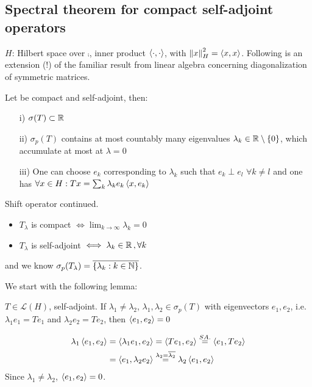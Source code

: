 \documentclass{article}
\begin{document}
\subsection{Spectral theorem for compact self-adjoint operators}
$H$: Hilbert space over $\comp$, inner product $\left<{\cdot},{\cdot}\right>$, with $\left\|{x}\right\|^2_H=\left<{x},{x}\right>$. Following is an extension (!) of the familiar result from linear algebra concerning diagonalization of symmetric matrices.
\begin{theorem}\nl
	Let   be compact and self-adjoint, then:
	\begin{itemize}
		\item [i)] $\sigma(T)\subset\mathbb{R}$
		\item [ii)] $\sigma_p(T)$ contains at most countably many eigenvalues $\lambda_k\in\mathbb{R}\setminus\{0\}$, which accumulate at most at $\lambda=0$
		\item [iii)] One can choose $e_k$  corresponding to $\lambda_k$ such that $e_k\perp e_l$ $\forall k\neq l$ and one has $\forall x\in H:Tx=\sum_k \lambda_k e_k\left<{x},{e_k}\right>$
	\end{itemize}
\end{theorem}
\begin{example}\nl
	Shift operator  continued.\\
	\begin{itemize}
	    \item $T_\lambda$ is compact $\iff \lim_{k\to\infty}\lambda_k=0$
	    \item $T_\lambda$ is self-adjoint $\iff \lambda_k\in\mathbb{R}\,,\forall k$
	\end{itemize}
	 and we know $\sigma_p(T_\lambda)=\overline{\{\lambda_k:k\in\mathbb{N}\}}$.
\end{example}
We start with the following lemma:
\begin{lemma}[Lemma 1]
	$T\in\mathcal{L}(H)$, self-adjoint. If $\lambda_1\neq\lambda_2$, $\lambda_1,\lambda_2\in\sigma_p(T)$ with eigenvectors $e_1,e_2$, i.e. $\lambda_1 e_1=Te_1$ and $\lambda_2e_2=Te_2$, then $\left<{e_1},{e_2}\right>=0$
	\begin{pf}{}{}
		\begin{equation}
			\begin{split}
			\lambda_1\left<{e_1},{e_2}\right>&=\left<{\lambda_1e_1},{e_2}\right>=\left<{Te_1},{e_2}\right>\stackrel{SA.}{=}\left<{e_1},{Te_2}\right>\\
			&=\left<{e_1},{\lambda_2e_2}\right>\stackrel{\lambda_2=\overline{\lambda_2}}{=}\lambda_2\left<{e_1},{e_2}\right>
			\end{split}
		\end{equation}
		Since $\lambda_1\neq\lambda_2$, $\left<{e_1},{e_2}\right>=0$.
	\end{pf}
\end{lemma}
\end{document}
